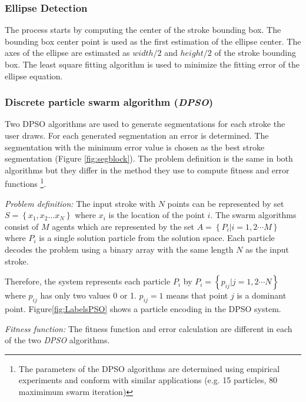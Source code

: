 \documentclass{article}
\begin{document}
\subsubsection{Ellipse Detection} 
The process starts by computing the center of the stroke bounding box. The bounding box center point is used as the first estimation of the ellipse center. The axes of the ellipse are estimated as $width/2$ and $height/2$ of the stroke bounding box. The least square fitting algorithm is used to minimize the fitting error of the ellipse equation.  

\subsubsection{Discrete particle swarm algorithm (\textit{DPSO})}
\label{subsubsec:Discreteparticleswarmalgorithm}
Two DPSO algorithms are used to generate segmentations for each stroke the user draws. For each generated segmentation an error is determined. The segmentation with the minimum error value is chosen as the best stroke segmentation (Figure \ref{fig:segblock}). The problem definition is the same in both algorithms but they differ in the method they use to compute fitness and error functions \footnote{The parameters of the DPSO algorithms are determined using empirical experiments and conform with similar applications \cite{PolygonApproximationPSO} (e.g. 15 particles, 80 maximimum swarm iteration)}. 

\textsl{Problem definition:} The input stroke with $N$ points can be represented by set $S = \left\{ {x_1 ,x_2  \ldots x_N }\right\}$ where $x_i$ is the location of the point $i$. The swarm algorithms consist of $M$ agents which are represented by the set  $A = \left\{ {P_i \left| {i = 1,2 \cdots M} \right.} \right\}$ where $P_i$ is a single solution particle from the solution space. Each particle decodes the problem using a binary array with the same length $N$ as the input stroke.  

Therefore, the system represents each particle $P_i$ by $P_i = \left\{ {p_{ij} \left| {j = 1,2 \cdots N} \right.} \right\}$ where $p_{ij}$ has only two values 0 or 1. $p_{ij}=1$ means that point $j$ is a dominant point. Figure\ref{fig:LabelsPSO} shows a particle encoding in the DPSO system. 

\textsl{Fitness function:} The fitness function and error calculation are different in each of the two \textit{DPSO} algorithms. 
\end{document}
